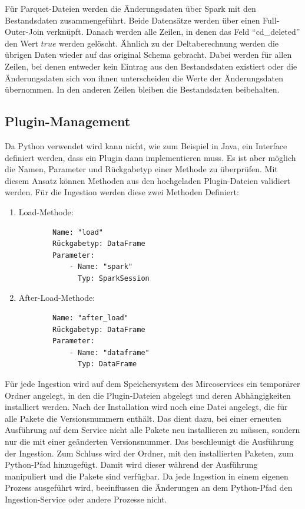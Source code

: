 Für Parquet-Dateien werden die Änderungsdaten über Spark mit den Bestandsdaten zusammengeführt.
Beide Datensätze werden über einen Full-Outer-Join verknüpft.
Danach werden alle Zeilen, in denen das Feld "`cd\_deleted"' den Wert $true$ werden gelöscht.
Ähnlich zu der Deltaberechnung werden die übrigen Daten wieder auf das original Schema gebracht.
Dabei werden für allen Zeilen, bei denen entweder kein Eintrag aus den Bestandsdaten existiert oder die Änderungsdaten sich von ihnen unterscheiden die Werte der Änderungsdaten übernommen.
In den anderen Zeilen bleiben die Bestandsdaten beibehalten.

\subsection{Plugin-Management}

Da Python verwendet wird kann nicht, wie zum Beispiel in Java, ein Interface definiert werden, dass ein Plugin dann implementieren muss.
Es ist aber möglich die Namen, Parameter und Rückgabetyp einer Methode zu überprüfen.
Mit diesem Ansatz können Methoden aus den hochgeladen Plugin-Dateien validiert werden.
Für die Ingestion werden diese zwei Methoden Definiert: \begin{enumerate}
    \item Load-Methode: \begin{verbatim}
        Name: "load"
        Rückgabetyp: DataFrame
        Parameter:
            - Name: "spark"
              Typ: SparkSession
    \end{verbatim}
    \item After-Load-Methode: \begin{verbatim}
        Name: "after_load"
        Rückgabetyp: DataFrame
        Parameter:
            - Name: "dataframe"
              Typ: DataFrame
    \end{verbatim}
\end{enumerate}

Für jede Ingestion wird auf dem Speichersystem des Mircoservices ein temporärer Ordner angelegt, in den die Plugin-Dateien abgelegt und deren Abhängigkeiten installiert werden.
Nach der Installation wird noch eine Datei angelegt, die für alle Pakete die Versionsnummern enthält.
Das dient dazu, bei einer erneuten Ausführung auf dem Service nicht alle Pakete neu installieren zu müssen, sondern nur die mit einer geänderten Versionsnummer.
Das beschleunigt die Ausführung der Ingestion.
Zum Schluss wird der Ordner, mit den installierten Paketen, zum Python-Pfad hinzugefügt.
Damit wird dieser während der Ausführung manipuliert und die Pakete sind verfügbar.
Da jede Ingestion in einem eigenen Prozess ausgeführt wird, beeinflussen die Änderungen an dem Python-Pfad den Ingestion-Service oder andere Prozesse nicht.

